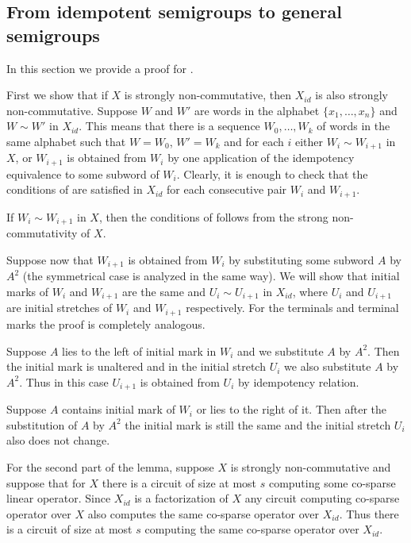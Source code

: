 \documentclass{toc}
\begin{document}
\subsection{From idempotent semigroups to general semigroups}\label{sec:noncommutative_extension}

In this section we provide a proof for .


First we show that if $X$ is strongly non-commutative, then $X_{id}$ is also strongly non-commutative.
Suppose $W$ and $W'$ are words in the alphabet $\{x_1,\ldots, x_n\}$ and $W \sim W'$ in $X_{id}$. This means that there is a sequence $W_0,\ldots, W_k$ of words in the same alphabet such that $W=W_0$, $W'=W_k$ and for each $i$ either $W_i \sim W_{i+1}$ in $X$, or $W_{i+1}$ is obtained from $W_i$ by one application of the idempotency equivalence to some subword of $W_i$. Clearly, it is enough to check that the conditions of  are satisfied in $X_{id}$ for each consecutive pair $W_i$ and $W_{i+1}$.

If $W_i \sim W_{i+1}$ in $X$, then the conditions of  follows from the strong non-commutativity of $X$.

Suppose now that $W_{i+1}$ is obtained from $W_{i}$ by substituting some subword $A$ by $A^2$ (the symmetrical case is analyzed in the same way). We will show that initial marks of $W_i$ and $W_{i+1}$ are the same and $U_{i} \sim U_{i+1}$ in $X_{id}$, where $U_{i}$ and $U_{i+1}$ are
%
%
initial stretches %
of $W_i$ and $W_{i+1}$ respectively. For the terminals and terminal marks the proof is completely analogous.

Suppose $A$ lies to the left of initial mark in $W_i$ and we substitute $A$ by $A^2$. Then the initial mark is unaltered and in the
%
%
initial stretch %
$U_i$ we also substitute $A$ by $A^2$. Thus in this case $U_{i+1}$ is obtained from $U_i$ by idempotency relation.

Suppose $A$ contains initial mark of $W_i$ or lies to the right of it. Then after the substitution of $A$ by $A^2$ the initial mark is still the same and the
%
%
initial stretch %
$U_i$ also does not change.


For the second part of the lemma, suppose $X$ is strongly non-commutative and suppose that for $X$ there is a circuit of size at most $s$ computing some
%
%
co-sparse
 linear operator.
Since $X_{id}$ is a factorization of $X$ any circuit computing
%
%
co-sparse
operator over $X$ also computes the same
%
%
co-sparse
operator over $X_{id}$. Thus there is a  circuit of size at most $s$ computing the same
%
%
co-sparse
operator over $X_{id}$.
%
%
\end{document}
